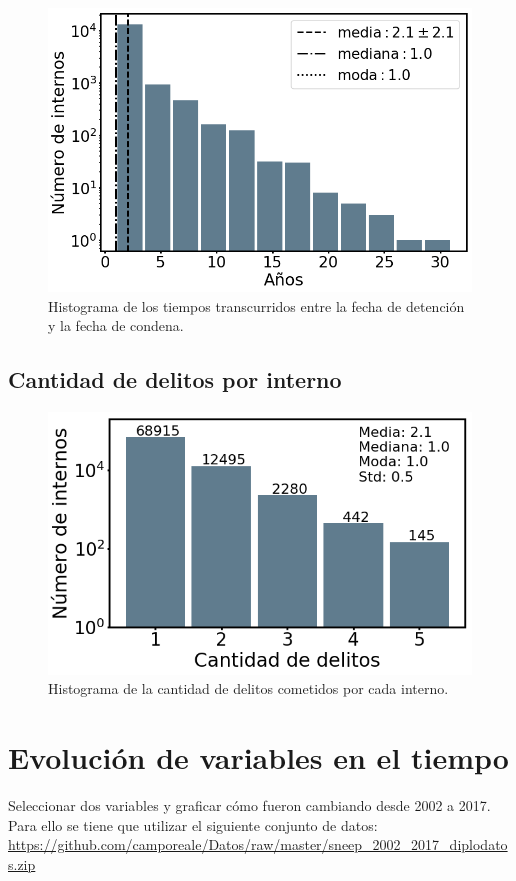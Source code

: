 \documentclass[10pt]{article}
\begin{document}
\begin{figure}[H]
	\centering
	\includegraphics[scale=0.3]{graficos/diff_condenado_detencion.png}
	\caption{Histograma de los tiempos transcurridos entre la fecha de detenci\'on y la fecha de condena. \label{fig:tiempo_detencion_condena}}
\end{figure}

\subsection{Cantidad de delitos por interno}

\begin{figure}[H]
	\centering
	\includegraphics[scale=0.4]{graficos/cantidad_delitos.png}
	\caption{Histograma de la cantidad de delitos cometidos por cada interno. \label{fig:cantidad_delitos}}
\end{figure}

\section{Evolución de variables en el tiempo}
Seleccionar dos variables y graficar cómo fueron cambiando desde 2002 a 2017. Para ello se tiene que utilizar el siguiente conjunto de datos: \url{https://github.com/camporeale/Datos/raw/master/sneep_2002_2017_diplodatos.zip}\\
\end{document}
